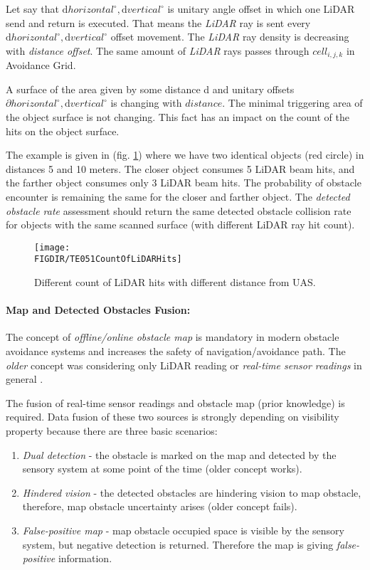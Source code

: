 Let say that $\text{d} horizontal^\circ, \text{d} vertical^\circ$ is unitary angle offset in which one LiDAR send and return is executed. That means the \emph{LiDAR} ray is sent every $\text{d} horizontal^\circ, \text{d} vertical^\circ$ offset movement. The \emph{LiDAR} ray density is decreasing with \emph{distance offset}. The same amount of \emph{LiDAR} rays passes through $cell_{i,j,k}$ in Avoidance Grid.

A surface of the area given by some distance d and unitary offsets$\partial horizontal^\circ, \text{d} vertical^\circ$  is changing with $distance$. The minimal triggering area of the object surface is not changing. This fact has an impact on the count of the hits on the object surface. 

The example is given in (fig. \ref{fig:P01CountOfLiDARHits}) where we have two identical objects (red circle) in distances 5 and 10 meters. The closer object consumes 5 LiDAR beam hits, and the farther object consumes only 3 LiDAR beam hits. The probability of obstacle encounter is remaining the same for the closer and farther object. The \emph{detected obstacle rate} assessment should return the same  detected obstacle collision rate for objects with the same scanned surface (with different LiDAR ray hit count).

\begin{figure}[H]
    \centering
    \texttt{[image: \\FIGDIR/TE051CountOfLiDARHits]}
    \caption{Different count of LiDAR hits with different distance from UAS.}
    \label{fig:P01CountOfLiDARHits}
\end{figure}


\paragraph{Map and Detected Obstacles Fusion:} The concept of \emph{offline/online obstacle map} is mandatory in modern obstacle avoidance systems and increases the safety of navigation/avoidance path. The \emph{older} concept was considering only LiDAR reading or \emph{real-time sensor readings} in general \cite{gomola2017probabilistic}. 

\newpage
The fusion of real-time sensor readings and obstacle map (prior knowledge) is required. Data fusion of these two sources is strongly depending on visibility property because there are three basic scenarios:

\begin{enumerate}
    \item \emph{Dual detection} - the obstacle is marked on the map and detected by the sensory system at some point of the time (older concept works).
    
    \item \emph{Hindered vision} - the detected obstacles are hindering vision to map obstacle, therefore, map obstacle uncertainty arises (older concept fails). 
    
    \item \emph{False-positive map} - map obstacle occupied space is visible by the sensory system, but negative detection is returned. Therefore the map is giving \emph{false-positive} information.
\end{enumerate}

